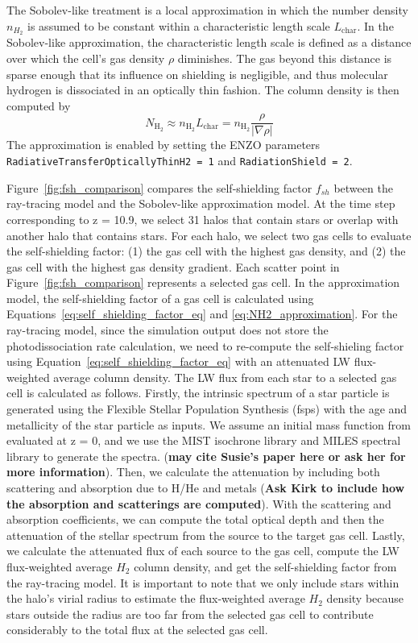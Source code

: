 \documentclass[linenumbers, twocolumn]{aastex631}
\begin{document}
The Sobolev-like treatment is a local approximation in which the number density $n_{H_{2}}$ is assumed to be constant within a characteristic length scale $L_{\text{char}}$. In the Sobolev-like approximation, the characteristic length scale is defined as a distance over which the cell's gas density $\rho$ diminishes. The gas beyond this distance is sparse enough that its influence on shielding is negligible, and thus molecular hydrogen is dissociated in an optically thin fashion. The column density is then computed by
\begin{equation}
    N_{\text{H}_{2}} \approx n_{\text{H}_{2}}L_{\text{char}} =  n_{\text{H}_{2}}\frac{\rho}{|\nabla\rho|}
\end{equation}
The approximation is enabled by setting the ENZO parameters \texttt{RadiativeTransferOpticallyThinH2 = 1} and \texttt{RadiationShield = 2}.



Figure~\ref{fig:fsh_comparison} compares the self-shielding factor $f_{sh}$ between the ray-tracing model and the Sobolev-like approximation model. At the time step corresponding to z = 10.9, we select 31 halos that contain stars or overlap with another halo that contains stars. For each halo, we select two gas cells to evaluate the self-shielding factor: (1) the gas cell with the highest gas density, and (2) the gas cell with the highest gas density gradient. Each scatter point in Figure~\ref{fig:fsh_comparison} represents a selected gas cell. In the approximation model, the self-shielding factor of a gas cell is calculated using Equations~\ref{eq:self_shielding_factor_eq} and \ref{eq:NH2_approximation}. For the ray-tracing model, since the simulation output does not store the photodissociation rate calculation, we need to re-compute the self-shieling factor using Equation~\ref{eq:self_shielding_factor_eq} with an attenuated LW flux-weighted average column density. The LW flux from each star to a selected gas cell is calculated as follows. Firstly, the intrinsic spectrum of a star particle is generated using the Flexible Stellar Population Synthesis (fsps) with the age and metallicity of the star particle as inputs. We assume an initial mass function from \cite{Dave+2008} evaluated at z = 0, and we use the MIST isochrone library and MILES spectral library to generate the spectra. (\textbf{may cite Susie's paper here or ask her for more information}). Then, we calculate the attenuation by including both scattering and absorption due to H/He and metals (\textbf{Ask Kirk to include how the absorption and scatterings are computed}). With the scattering and absorption coefficients, we can compute the total optical depth and then the attenuation of the stellar spectrum from the source to the target gas cell. Lastly, we calculate the attenuated flux of each source to the gas cell, compute the LW flux-weighted average $H_{2}$ column density, and get the self-shielding factor from the ray-tracing model. It is important to note that we only include stars within the halo's virial radius to estimate the flux-weighted average $H_{2}$ density because stars outside the radius are too far from the selected gas cell to contribute considerably to the total flux at the selected gas cell. 
\end{document}
